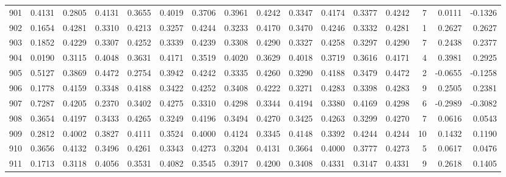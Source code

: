 \begin{tabular}{lrrrrrrrrrrrrrrr}
901 &      0.4131 &  0.2805 &  0.4131 &  0.3655 &  0.4019 &  0.3706 &  0.3961 &  0.4242 &  0.3347 &  0.4174 &   0.3377 &     0.4242 &      7 &                    0.0111 &                    -0.1326 \\
902 &      0.1654 &  0.4281 &  0.3310 &  0.4213 &  0.3257 &  0.4244 &  0.3233 &  0.4170 &  0.3470 &  0.4246 &   0.3332 &     0.4281 &      1 &                    0.2627 &                     0.2627 \\
903 &      0.1852 &  0.4229 &  0.3307 &  0.4252 &  0.3339 &  0.4239 &  0.3308 &  0.4290 &  0.3327 &  0.4258 &   0.3297 &     0.4290 &      7 &                    0.2438 &                     0.2377 \\
904 &      0.0190 &  0.3115 &  0.4048 &  0.3631 &  0.4171 &  0.3519 &  0.4020 &  0.3629 &  0.4018 &  0.3719 &   0.3616 &     0.4171 &      4 &                    0.3981 &                     0.2925 \\
905 &      0.5127 &  0.3869 &  0.4472 &  0.2754 &  0.3942 &  0.4242 &  0.3335 &  0.4260 &  0.3290 &  0.4188 &   0.3479 &     0.4472 &      2 &                   -0.0655 &                    -0.1258 \\
906 &      0.1778 &  0.4159 &  0.3348 &  0.4188 &  0.3422 &  0.4252 &  0.3408 &  0.4222 &  0.3271 &  0.4283 &   0.3398 &     0.4283 &      9 &                    0.2505 &                     0.2381 \\
907 &      0.7287 &  0.4205 &  0.2370 &  0.3402 &  0.4275 &  0.3310 &  0.4298 &  0.3344 &  0.4194 &  0.3380 &   0.4169 &     0.4298 &      6 &                   -0.2989 &                    -0.3082 \\
908 &      0.3654 &  0.4197 &  0.3433 &  0.4265 &  0.3249 &  0.4196 &  0.3494 &  0.4270 &  0.3425 &  0.4263 &   0.3299 &     0.4270 &      7 &                    0.0616 &                     0.0543 \\
909 &      0.2812 &  0.4002 &  0.3827 &  0.4111 &  0.3524 &  0.4000 &  0.4124 &  0.3345 &  0.4148 &  0.3392 &   0.4244 &     0.4244 &     10 &                    0.1432 &                     0.1190 \\
910 &      0.3656 &  0.4132 &  0.3496 &  0.4261 &  0.3343 &  0.4273 &  0.3204 &  0.4131 &  0.3664 &  0.4000 &   0.3777 &     0.4273 &      5 &                    0.0617 &                     0.0476 \\
911 &      0.1713 &  0.3118 &  0.4056 &  0.3531 &  0.4082 &  0.3545 &  0.3917 &  0.4200 &  0.3408 &  0.4331 &   0.3147 &     0.4331 &      9 &                    0.2618 &                     0.1405 \\

\end{tabular}
